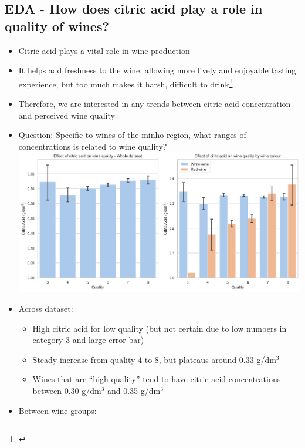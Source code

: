 \documentclass[
]{article}
\providecommand{\tightlist}{%
  \setlength{\itemsep}{0pt}\setlength{\parskip}{0pt}}
\begin{document}
\subsection{EDA - How does citric acid play a role in quality of
wines?}\label{eda---how-does-citric-acid-play-a-role-in-quality-of-wines}

\begin{itemize}
\tightlist
\item
  Citric acid plays a vital role in wine production
\item
  It helps add freshness to the wine, allowing more lively and enjoyable
  tasting experience, but too much makes it harsh, difficult to
  drink\footnote{\textcite{RN3}}
\item
  Therefore, we are interested in any trends between citric acid
  concentration and perceived wine quality
\item
  Question: Specific to wines of the minho region, what ranges of
  concentrations is related to wine quality?
  \includegraphics{whole_data_by_colour_citric_acid_vs_quality.png}
\item
  Across dataset:

  \begin{itemize}
  \tightlist
  \item
    High citric acid for low quality (but not certain due to low numbers
    in category 3 and large error bar)
  \item
    Steady increase from quality 4 to 8, but plateaus around 0.33
    g/dm\(^3\)
  \item
    Wines that are ``high quality'' tend to have citric acid
    concentrations between 0.30 g/dm\(^3\) and 0.35 g/dm\(^3\)
  \end{itemize}
\item
  Between wine groups:


\end{itemize}
\end{document}
